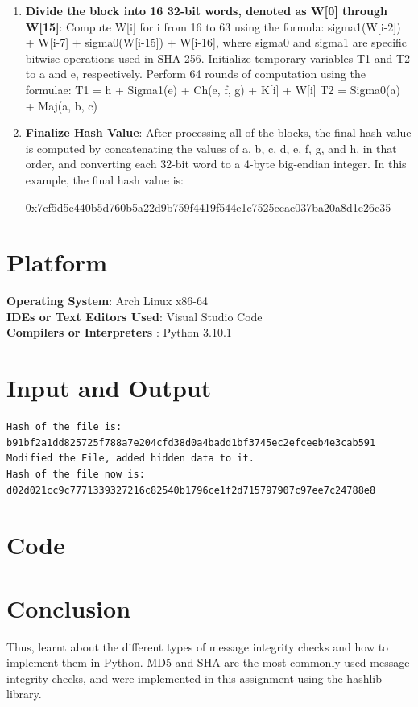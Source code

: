 \documentclass[11pt]{article}
\begin{document}
\begin{enumerate}
    \item \textbf{Divide the block into 16 32-bit words, denoted as W[0] through W[15]}:
          Compute W[i] for i from 16 to 63 using the formula: sigma1(W[i-2]) + W[i-7] + sigma0(W[i-15]) + W[i-16], where sigma0 and sigma1 are specific bitwise operations used in SHA-256.
          Initialize temporary variables T1 and T2 to a and e, respectively.
          Perform 64 rounds of computation using the formulae:
          T1 = h + Sigma1(e) + Ch(e, f, g) + K[i] + W[i]
          T2 = Sigma0(a) + Maj(a, b, c)

    \item \textbf{Finalize Hash Value}: After processing all of the blocks, the final hash value is computed by concatenating the values of a, b, c, d, e, f, g, and h, in that order, and converting each 32-bit word to a 4-byte big-endian integer. In this example, the final hash value is:

          0x7cf5d5e440b5d760b5a22d9b759f4419f544e1e7525ccae037ba20a8d1e26c35
\end{enumerate}


\section{Platform}
\textbf{\textbf{Operating System}}: Arch Linux x86-64 \\
\textbf{\textbf{IDEs or Text Editors Used}}: Visual Studio Code\\
\textbf{\textbf{Compilers or Interpreters} }: Python 3.10.1\\

\section{Input and Output}
\begin{verbatim}
Hash of the file is: 
b91bf2a1dd825725f788a7e204cfd38d0a4badd1bf3745ec2efceeb4e3cab591
Modified the File, added hidden data to it.
Hash of the file now is: 
d02d021cc9c7771339327216c82540b1796ce1f2d715797907c97ee7c24788e8
\end{verbatim}
\section{Code}


\section{Conclusion}
Thus, learnt about the different types of message integrity checks and how to implement them in Python.
MD5 and SHA are the most commonly used message integrity checks, and were implemented in this assignment using the hashlib library.
\end{document}
